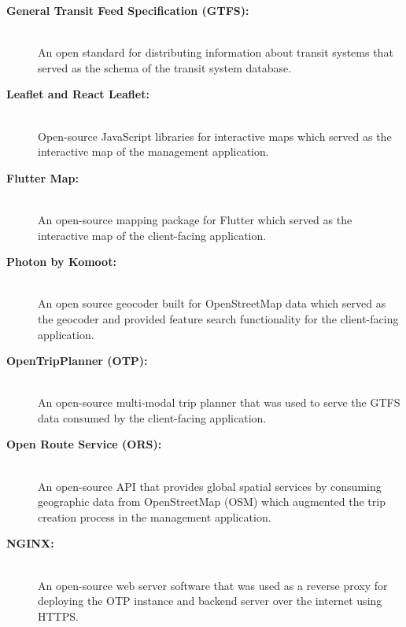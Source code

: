 \documentclass[journal]{./IEEE/IEEEtran}
\begin{document}
\begin{description}
    \item[\textbf{General Transit Feed Specification (GTFS):}] \hfill \\
        An open standard for distributing information about transit systems that served as the schema of the transit system database.
    
    \item[\textbf{Leaflet and React Leaflet:}] \hfill \\
        Open-source JavaScript libraries for interactive maps which served as the interactive map of the management application.

    \item[\textbf{Flutter Map:}] \hfill \\
        An open-source mapping package for Flutter which served as the interactive map of the client-facing application.

    \item[\textbf{Photon by Komoot:}] \hfill \\
        An open source geocoder built for OpenStreetMap data which served as the geocoder and provided feature search functionality for the client-facing application.

    \item[\textbf{OpenTripPlanner (OTP):}] \hfill \\
        An open-source multi-modal trip planner that was used to serve the GTFS data consumed by the client-facing application.

    \newpage

    \item[\textbf{Open Route Service (ORS):}] \hfill \\
        An open-source API that provides global spatial services by consuming geographic data from OpenStreetMap (OSM) which augmented the trip creation process in the management application.

    \item[\textbf{NGINX:}] \hfill \\
        An open-source web server software that was used as a reverse proxy for deploying the OTP instance and backend server over the internet using HTTPS.
\end{description}
\end{document}
